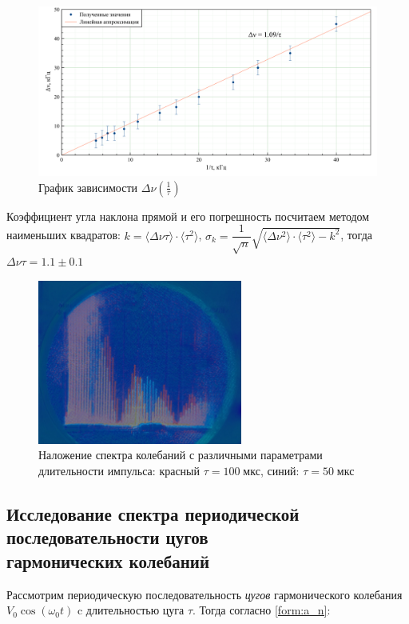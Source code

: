 \documentclass[a4paper, 12pt]{article}
\begin{document}
\begin{figure}[H]
\centering
\includegraphics[width = \textwidth]{GraphA}
\caption{График зависимости $\Delta \nu (\frac{1}{\tau})$}
\end{figure}

Коэффициент угла наклона прямой и его погрешность посчитаем методом наименьших квадратов: $k = \langle \Delta \nu \tau \rangle \cdot \langle \tau^2 \rangle$, $\sigma_k = \dfrac{1}{\sqrt{n}} \sqrt{\langle \Delta \nu^2 \rangle \cdot \langle \tau^2 \rangle - k^2}$, тогда $\Delta \nu \tau = 1.1 \pm 0.1$

\begin{figure}[H]
\centering
\includegraphics[width = 0.6\textwidth]{A}
\caption{Наложение спектра колебаний с различными параметрами длительности импульса: красный $\tau = 100 \; \text{мкс}$, синий: $\tau = 50 \; \text{мкс}$}
\end{figure}

\subsection*{Исследование спектра периодической последовательности цугов \\ гармонических колебаний}

Рассмотрим периодическую последовательность {\it{цугов}} гармонического колебания \\
$V_0 \cos (\omega_0 t)$ c длительностью цуга $\tau$.
Тогда согласно \ref{form:a_n}:
\end{document}
